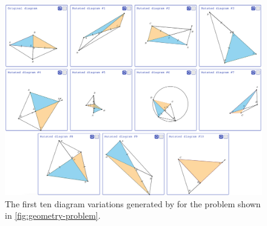 \begin{figure}
    \centering
    \includegraphics[width=\linewidth]{assets/edgeworth/geometry-grid.png}
    \caption{\textmd{The first ten diagram variations generated by \Edgeworth for the problem shown in \cref{fig:geometry-problem}.}}
    \label{fig:geometry-grid}
\end{figure}







